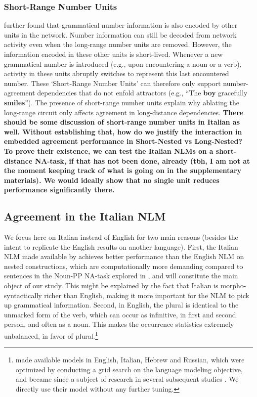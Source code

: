\subsubsection{Short-Range Number Units}
\citet{lakretz2019emergence} further found that grammatical number information is also encoded by other units in the network. 
Number information can still be decoded from network activity even when the long-range number units are removed. 
However, the information encoded in these other units is short-lived. Whenever a new grammatical number  is
introduced (e.g., upon encountering a noun or a verb), activity in
these units abruptly switches to represent this last encountered
number. These `Short-Range Number Units' can therefore only support number-agreement dependencies that do not
enfold attractors (e.g., ``The \textbf{boy} gracefully
\textbf{smiles}''). The presence of short-range number units explain why ablating the long-range circuit only affects agreement in long-distance dependencies. \textbf{There should be some discussion of short-range number units in Italian as well. Without establishing that, how do we justify the interaction in embedded agreement performance in Short-Nested vs Long-Nested? To prove their existence, we can test the Italian NLMs on a short-distance NA-task, if that has not been done, already (tbh, I am not at the moment keeping track of what is going on in the supplementary materials). We would ideally show that no single unit reduces performance significantly there.}


\subsection{Agreement in the Italian NLM}
We focus here on Italian instead of English for two main reasons (besides the intent to replicate the English results on another language). First, the Italian NLM made available by \citet{Gulordava:etal:2018} achieves better performance than the English NLM on nested constructions, which are computationally more demanding compared to sentences in the Noun-PP NA-task explored in \citet{lakretz2019emergence}, and will constitute the main object of our study. This might be explained by the fact that Italian is morpho-syntactically richer than English, making it more important for the NLM to pick up grammatical information. Second, in English, the plural is identical to the unmarked form of the verb, which can occur as infinitive, in first and second person, and often as a noun. This makes the occurrence statistics extremely unbalanced, in favor of plural.\footnote{\citet{Gulordava:etal:2018} made available models in English, Italian, Hebrew and Russian, which were optimized by conducting a grid search on the language modeling objective, and became since a subject of research in several subsequent studies \citep{Giulianelli:etal:2018, jumelet2019analysing, wilcox2018rnn, futrell2019neural}. We directly use their model without any further tuning.}

